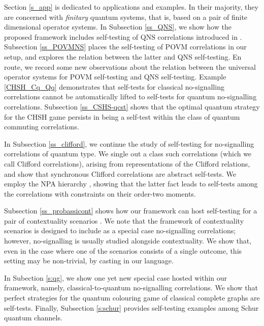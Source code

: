 \documentclass[11pt]{amsart}
\theoremstyle{definition}
\begin{document}
Section \ref{s_app} is dedicated to applications and examples. 
In their majority, they are concerned with \emph{finitary} quantum systems, 
that is, based on a pair of finite dimensional operator systems. 
In Subsection \ref{ss_QNS}, we show how the proposed framework includes 
self-testing of QNS correlations introduced in \cite{tt-QNS}. 
Subsection \ref{ss_POVMNS} places the self-testing of 
POVM correlations \cite{pszz} in our setup, and explores the 
relation between the latter and QNS self-testing. En route, 
we record some new observations about the relation between 
the universal operator systems for POVM self-testing and
QNS self-testing. Example \ref{CHSH_Cq_Qq} demonstrates that 
self-tests for classical no-signalling correlations cannot be 
automatically lifted to self-tests for quantum no-signalling correlations. 
Subsection \ref{ss_CSHS-qcst} shows that the optimal quantum strategy 
for the CHSH game persists in being a self-test within the class of 
quantum commuting correlations. 

In Subsection \ref{ss_clifford}, we continue the study of self-testing 
for no-signalling correlations of quantum type. 
We single out a class such correlations (which we call Clifford correlations), 
arising from representations of the Clifford relations, and 
show that synchronous Clifford correlations are abstract self-tests. 
We employ the NPA hierarchy \cite{npa}, showing that the 
latter fact leads to self-tests among the correlations with 
constraints on their order-two moments. 

Subsection \ref{ss_probassicont} shows how our framework can host 
self-testing for a pair of contextuality scenarios \cite{acin-etal}. 
We note that the framework of contextuality scenarios is designed to include as a special case
no-signalling correlations; however, no-signalling is usually studied alongside 
contextuality. 
We show that, even in the case where one of the scenarios 
consists of a single outcome, 
this setting may be non-trivial, by casting \cite[Main Theorem]{brv-etal} 
in our language. 

In Subection \ref{s:qg}, we show one yet new special case hosted within
our framework, namely, classical-to-quantum no-signalling correlations. 
We show that perfect strategies for the quantum colouring game of classical 
complete graphs are self-tests. 
Finally, Subsection \ref{s:schur} provides self-testing examples among 
Schur quantum channels. 
\end{document}
